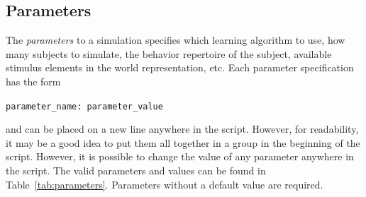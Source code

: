\documentclass[11pt]{article}
\newcommand{\scr}[1]{\lstinline|#1|}
\begin{document}
\subsection{Parameters}
The \emph{parameters} to a simulation specifies which learning algorithm to use, how many subjects to simulate, the behavior repertoire of the subject, available stimulus elements in the world representation, etc. Each parameter specification has the form 
\begin{center}
	\scr{parameter_name: parameter_value}
\end{center}
and can be placed on a new line anywhere in the script. However, for readability, it may be a good idea to put them all together in a group in the beginning of the script. However, it is possible to change the value of any parameter anywhere in the script.
The valid parameters and values can be found in Table~\ref{tab:parameters}.
Parameters without a default value are required.
\end{document}

